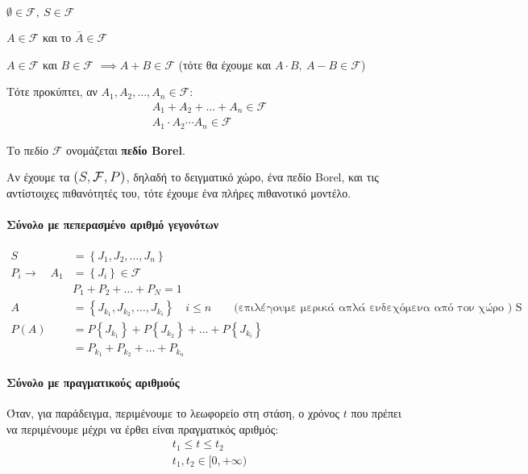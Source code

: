 \documentclass[11pt,a4paper,notitlepage,fleqn,final]{article}
\begin{document}
	\begin{enumroman}
		\item \( \emptyset \in \mathcal F,\
		S \in \mathcal{F}
		 \)
		\item \( A \in \mathcal F \) και το \( \bar A \in \mathcal F \)
		\item \( A \in \mathcal F \) και \( B \in \mathcal F \)
		\( \implies A + B \in \mathcal F \) \quad
		(τότε θα έχουμε και \( A\cdot B,\ A-B \in \mathcal F \))
	\end{enumroman}
	
	Τότε προκύπτει, αν \( A_1,A_2,\dots,A_n \in \mathcal F \):
	\begin{gather*}
		A_1+A_2+\dots +A_n \in \mathcal F \\
		A_1\cdot A_2 \cdots A_n \in \mathcal F
	\end{gather*}
	
	Το πεδίο \( \mathcal F \) ονομάζεται \textbf{πεδίο Borel}.
	
	Αν έχουμε τα \( \mathlarger{\mathlarger{(S,\mathcal F,P)}} \),
	δηλαδή το
	δειγματικό χώρο, ένα πεδίο Borel, και τις αντίστοιχες πιθανότητές
	του, τότε έχουμε ένα πλήρες πιθανοτικό μοντέλο.
	
	\paragraph{Σύνολο με πεπερασμένο αριθμό γεγονότων}
	\begin{align*}
		S &= \left\lbrace J_1,J_2,\dots,J_n \right\rbrace \\
		P_i \to \quad A_1 &= 
		\left\lbrace J_i \right\rbrace \in \mathcal F \\
		& P_1+P_2+\dots+P_N = 1 \\
		A &= \left\lbrace J_{k_1},J_{k_2},\dots,J_{k_i} \right\rbrace
		\quad i \leq n \qquad \text{(επιλέγουμε μερικά
			απλά ενδεχόμενα από τον χώρο ) S} \\
		P(A) &= P\left\lbrace J_{k_1} \right\rbrace +
		P\left\lbrace J_{k_2} \right\rbrace + \dots +
		P\left\lbrace J_{k_i} \right\rbrace \\ &=
		P_{k_1} + P_{k_2} + \dots + P_{k_n}
	\end{align*}
	
	\paragraph{Σύνολο με πραγματικούς αριθμούς}
	Όταν, για παράδειγμα, περιμένουμε το λεωφορείο στη στάση, ο χρόνος
	\( t \) που πρέπει να περιμένουμε μέχρι να έρθει είναι πραγματικός
	αριθμός:
	\begin{gather*}
		t_1 \leq t \leq t_2 \\ t_1,t_2 \in [0,+\infty)
	\end{gather*}
	
\end{document}

